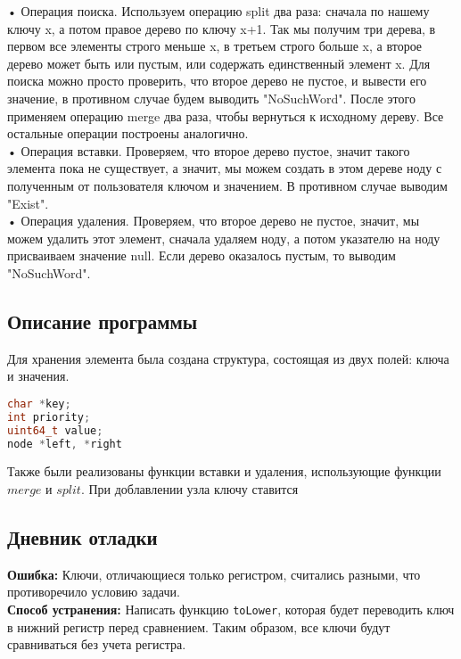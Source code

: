 \documentclass[12pt]{article}
\begin{document}
• Операция поиска. Используем операцию split два раза: сначала по нашему ключу
x, а потом правое дерево по ключу x+1. Так мы получим три дерева, в первом все
элементы строго меньше x, в третьем строго больше x, а второе дерево может быть
или пустым, или содержать единственный элемент x. Для поиска можно просто
проверить, что второе дерево не пустое, и вывести его значение, в противном
случае будем выводить "NoSuchWord". После этого применяем операцию merge
два раза, чтобы вернуться к исходному дереву. Все остальные операции построены
аналогично. \\
• Операция вставки. Проверяем, что второе дерево пустое, значит такого элемента
пока не существует, а значит, мы можем создать в этом дереве ноду с полученным
от пользователя ключом и значением. В противном случае выводим "Exist".\\
• Операция удаления. Проверяем, что второе дерево не пустое, значит, мы можем
удалить этот элемент, сначала удаляем ноду, а потом указателю на ноду присваиваем
значение null. Если дерево оказалось пустым, то выводим "NoSuchWord".\\


\subsection*{Описание программы}

Для хранения элемента была создана структура, состоящая из двух полей: ключа и значения.

\begin{lstlisting}[language=C++]
char *key;
int priority;
uint64_t value;
node *left, *right
\end{lstlisting}

Также были реализованы функции вставки и удаления, использующие функции $merge$ и $split$.
При доблавлении узла ключу ставится 


\subsection*{Дневник отладки}

\textbf{Ошибка:} Ключи, отличающиеся только регистром, считались разными, что противоречило условию задачи. \\


\textbf{Способ устранения:} Написать функцию \texttt{toLower}, которая будет переводить ключ в нижний регистр перед сравнением. Таким образом, все ключи будут сравниваться без учета регистра.
\end{document}
